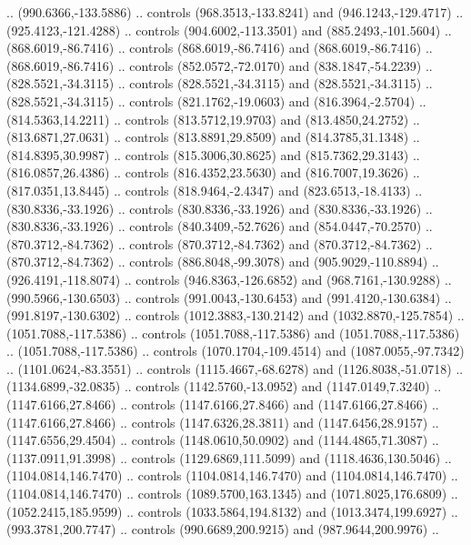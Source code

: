 \begin{scope}[shift={(-127.26916,-608.18524)}]
\begin{scope}
\begin{scope}[shift={(-630.60299,773.9938)},opacity=0.500,transparency group]
        .. (990.6366,-133.5886) .. controls (968.3513,-133.8241) and
        (946.1243,-129.4717) .. (925.4123,-121.4288) .. controls (904.6002,-113.3501)
        and (885.2493,-101.5604) .. (868.6019,-86.7416) .. controls
        (868.6019,-86.7416) and (868.6019,-86.7416) .. (868.6019,-86.7416) .. controls
        (852.0572,-72.0170) and (838.1847,-54.2239) .. (828.5521,-34.3115) .. controls
        (828.5521,-34.3115) and (828.5521,-34.3115) .. (828.5521,-34.3115) .. controls
        (821.1762,-19.0603) and (816.3964,-2.5704) .. (814.5363,14.2211) .. controls
        (813.5712,19.9703) and (813.4850,24.2752) .. (813.6871,27.0631) .. controls
        (813.8891,29.8509) and (814.3785,31.1348) .. (814.8395,30.9987) .. controls
        (815.3006,30.8625) and (815.7362,29.3143) .. (816.0857,26.4386) .. controls
        (816.4352,23.5630) and (816.7007,19.3626) .. (817.0351,13.8445) .. controls
        (818.9464,-2.4347) and (823.6513,-18.4133) .. (830.8336,-33.1926) .. controls
        (830.8336,-33.1926) and (830.8336,-33.1926) .. (830.8336,-33.1926) .. controls
        (840.3409,-52.7626) and (854.0447,-70.2570) .. (870.3712,-84.7362) .. controls
        (870.3712,-84.7362) and (870.3712,-84.7362) .. (870.3712,-84.7362) .. controls
        (886.8048,-99.3078) and (905.9029,-110.8894) .. (926.4191,-118.8074) ..
        controls (946.8363,-126.6852) and (968.7161,-130.9288) .. (990.5966,-130.6503)
        .. controls (991.0043,-130.6453) and (991.4120,-130.6384) ..
        (991.8197,-130.6302) .. controls (1012.3883,-130.2142) and
        (1032.8870,-125.7854) .. (1051.7088,-117.5386) .. controls
        (1051.7088,-117.5386) and (1051.7088,-117.5386) .. (1051.7088,-117.5386) ..
        controls (1070.1704,-109.4514) and (1087.0055,-97.7342) ..
        (1101.0624,-83.3551) .. controls (1115.4667,-68.6278) and (1126.8038,-51.0718)
        .. (1134.6899,-32.0835) .. controls (1142.5760,-13.0952) and
        (1147.0149,7.3240) .. (1147.6166,27.8466) .. controls (1147.6166,27.8466) and
        (1147.6166,27.8466) .. (1147.6166,27.8466) .. controls (1147.6326,28.3811) and
        (1147.6456,28.9157) .. (1147.6556,29.4504) .. controls (1148.0610,50.0902) and
        (1144.4865,71.3087) .. (1137.0911,91.3998) .. controls (1129.6869,111.5099)
        and (1118.4636,130.5046) .. (1104.0814,146.7470) .. controls
        (1104.0814,146.7470) and (1104.0814,146.7470) .. (1104.0814,146.7470) ..
        controls (1089.5700,163.1345) and (1071.8025,176.6809) .. (1052.2415,185.9599)
        .. controls (1033.5864,194.8132) and (1013.3474,199.6927) ..
        (993.3781,200.7747) .. controls (990.6689,200.9215) and (987.9644,200.9976) ..

\end{scope}
\end{scope}
\end{scope}
